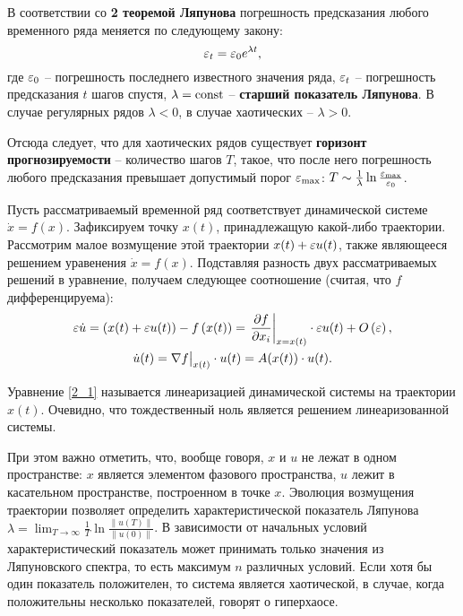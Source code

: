 
В соответствии со \textbf{2 теоремой Ляпунова} погрешность предсказания любого временного ряда меняется по следующему закону:
\begin{equation*}
    \varepsilon_t = \varepsilon_0 e^{\lambda t},
\end{equation*}
где $\varepsilon_0$ -- погрешность последнего известного значения ряда, $\varepsilon_t$ -- погрешность предсказания $t$ шагов спустя, $\lambda = \mathrm{const}$ -- \textbf{старший показатель Ляпунова}. В случае регулярных рядов $\lambda < 0$, в случае хаотических -- $\lambda > 0$.

Отсюда следует, что для хаотических рядов существует \textbf{горизонт прогнозируемости} -- количество шагов $T$, такое, что после него погрешность любого предсказания превышает допустимый порог $\varepsilon_{\text{max}}$: $T \sim \frac{1}{\lambda} \ln \frac{\varepsilon_{\text{max}}}{\varepsilon_0}$.

Пусть рассматриваемый временной ряд соответствует динамической системе $\dot{x} = f(x)$.
Зафиксируем точку $x(t)$, принадлежащую какой-либо траектории. Рассмотрим малое возмущение этой траектории $x(t) + \varepsilon u(t)$, также являющееся решением уравенения $\dot{x} = f(x)$.
Подставляя разность двух рассматриваемых решений в уравнение, получаем следующее соотношение (считая, что $f$ дифференцируема):
\begin{gather}
\nonumber
    \varepsilon \dot{u} = 
    \left( x(t) + \varepsilon u(t) \right) - f\left( x(t) \right) =
    \left. \frac{\partial f}{\partial x_i} \right|_{x=x(t)} \cdot \varepsilon u(t) + O\left( \varepsilon \right), \\
\label{2_1}
    \dot{u}(t) = \nabla f \big|_{x(t)} \cdot u(t) = A(x(t)) \cdot u(t).
\end{gather}

Уравнение \eqref{2_1} называется линеаризацией динамической системы на траектории $x(t)$.
Очевидно, что тождественный ноль является решением линеаризованной системы.

При этом важно отметить, что, вообще говоря, $x$ и $u$ не лежат в одном пространстве: $x$ является элементом фазового пространства, $u$ лежит в касательном пространстве, построенном в точке $x$.
Эволюция возмущения траектории позволяет определить характеристической показатель Ляпунова $\lambda = \lim_{T \to \infty} \frac{1}{T} \ln \frac{\| u(T) \|}{\| u(0) \|}$.
В зависимости от начальных условий характеристический показатель может принимать только значения из Ляпуновского спектра, то есть максимум $n$ различных условий.
Если хотя бы один показатель положителен, то система является хаотической, в случае, когда положительны несколько показателей, говорят о гиперхаосе.

